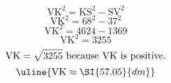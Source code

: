 \[\text{VK}^{2}=\text{KS}^{2}-\text{SV}^{2}\]
\[\text{VK}^{2}=68^{2}-37^{2}\]
\[\text{VK}^{2}=4624-1369\]
\[\text{VK}^{2}=3255\]
\[\text{VK}=\sqrt{\mathstrut 3255}\text{ because VK is positive.}\]
\[\uline{\text{VK}\approx\SI{57.05}{dm}}\]